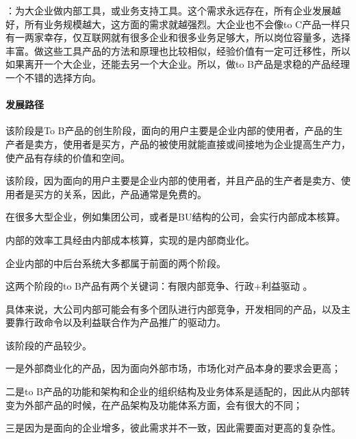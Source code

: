 \documentclass[letterpaper,10pt,english]{sphinxmanual}
\begin{document}
：为大企业做内部工具，或业务支持工具。这个需求永远存在，所有企业发展越好，所有业务规模越大，这方面的需求就越强烈。大企业也不会像to
C产品一样只有一两家幸存，仅互联网就有很多企业和很多业务足够大，所以岗位容量多，选择丰富。做这些工具产品的方法和原理也比较相似，经验价值有一定可迁移性，所以如果离开一个大企业，还能去另一个大企业。所以，做to
B产品是求稳的产品经理一个不错的选择方向。
%
\begin{footnote}[78]\sphinxAtStartFootnote
{}
%
\end{footnote}


\paragraph{发展路径}
\label{\detokenize{chapter_introduction/2B:id13}}

该阶段是To
B产品的创生阶段，面向的用户主要是企业内部的使用者，产品的生产者是卖方，使用者是买方，产品的被使用就能直接或间接地为企业提高生产力，使产品有存续的价值和空间。

该阶段，因为面向的用户主要是企业内部的使用者，并且产品的生产者是卖方、使用者是买方的关系，因此，产品通常是免费的。


在很多大型企业，例如集团公司，或者是BU结构的公司，会实行内部成本核算。

内部的效率工具经由内部成本核算，实现的是内部商业化。

企业内部的中后台系统大多都属于前面的两个阶段。

这两个阶段的to B产品有两个关键词：有限内部竞争、行政+利益驱动 。

具体来说，大公司内部可能会有多个团队进行内部竞争，开发相同的产品，以及主要靠行政命令以及利益联合作为产品推广的驱动力。


该阶段的产品较少。

一是外部商业化的产品，因为面向外部市场，市场化对产品本身的要求会更高；

二是to
B产品的功能和架构和企业的组织结构及业务体系是适配的，因此从内部转变为外部产品的时候，在产品架构及功能体系方面，会有很大的不同；

三是因为是面向的企业增多，彼此需求并不一致，因此需要面对更高的复杂性。
\end{document}
